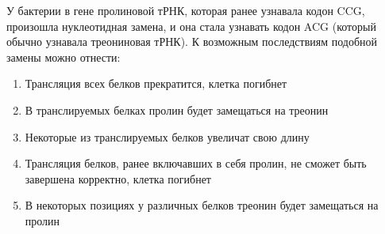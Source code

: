 
У бактерии
в гене пролиновой тРНК, которая ранее узнавала кодон CCG, произошла
нуклеотидная замена, и она стала узнавать кодон ACG (который обычно узнавала
треониновая тРНК). К возможным последствиям подобной замены можно отнести:

\begin{enumerate}
    \item Трансляция всех белков прекратится, клетка погибнет
    \item В транслируемых белках пролин будет замещаться на треонин
    \item Некоторые из транслируемых белков увеличат свою длину
    \item Трансляция белков, ранее включавших в себя пролин, не сможет быть завершена корректно, клетка погибнет
    \item В некоторых позициях у различных белков треонин будет замещаться на пролин
\end{enumerate}

\explanationSection

